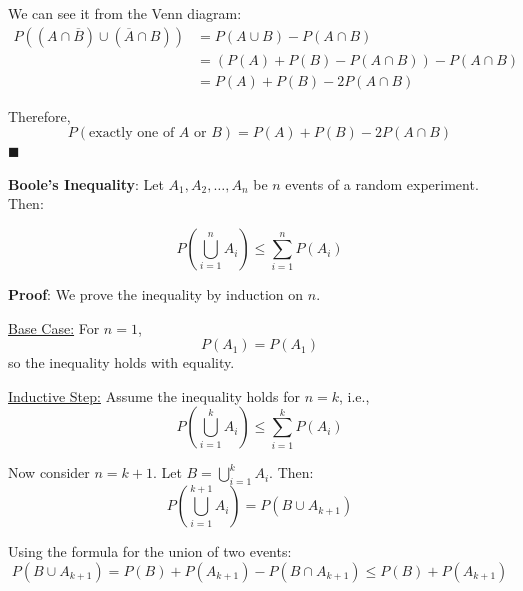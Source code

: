 \documentclass[twoside]{book}
\begin{document}
\begin{center}
\end{center}

We can see it from the Venn diagram:
\begin{align*}
    P((A \cap \overline{B}) \cup (\overline{A} \cap B)) &= P(A \cup B) - P(A \cap B) \\
    &= (P(A) + P(B) - P(A \cap B)) - P(A \cap B) \\
    &= P(A) + P(B) - 2P(A \cap B)
\end{align*}

Therefore,
\[
P(\text{exactly one of } A \text{ or } B) = P(A) + P(B) - 2P(A \cap B)
\]
\hfill\(\blacksquare\)

\begin{textbox}
\textbf{Boole's Inequality}: Let \( A_1, A_2, \ldots, A_n \) be $n$ events of a random experiment. Then:

\[
P\left( \bigcup_{i=1}^{n} A_i \right) \leq \sum_{i=1}^{n} P(A_i)
\]
\end{textbox}

\textbf{Proof}: We prove the inequality by induction on \( n \).

\underline{Base Case:} For \( n = 1 \),
\[
P(A_1) = P(A_1)
\]
so the inequality holds with equality.

\underline{Inductive Step:} Assume the inequality holds for \( n = k \), i.e.,
\[
P\left( \bigcup_{i=1}^{k} A_i \right) \leq \sum_{i=1}^{k} P(A_i)
\]

Now consider \( n = k+1 \). Let \( B = \bigcup_{i=1}^{k} A_i \). Then:
\[
P\left( \bigcup_{i=1}^{k+1} A_i \right) = P(B \cup A_{k+1})
\]

Using the formula for the union of two events:
\[
P(B \cup A_{k+1}) = P(B) + P(A_{k+1}) - P(B \cap A_{k+1}) \leq P(B) + P(A_{k+1})
\]
\end{document}
